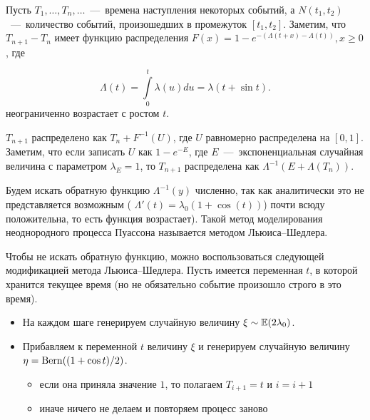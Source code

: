 

Пусть \( T_1,\ldots,T_n,\ldots \)~---~времена наступления некоторых 
 событий, а \( N(t_1,t_2) \)~---~количество событий, произошедших в 
 промежуток \( [t_1,t_2] \). Заметим, что \( T_{n+1}-T_n \) имеет 
 функцию распределения \( F(x)=1-e^{-(\Lambda(t+x)-\Lambda(t))}, x 
 \geq 0 \), где 


\[
 \Lambda(t)=\int\limits_0^t\lambda(u)du=\lambda(t+\sin t).
\]
неограниченно возрастает с ростом \( t \). 

\( T_{n+1} \) распределено как \( T_n+F^{-1}(U) \), где \( U \) 
 равномерно распределена на \( [0,1] \). Заметим, что если записать 
 \( U \) как \( 1-e^{-E} \), где \( E \)~---~экспоненциальная случайная 
 величина с параметром \( \lambda_E=1 \), то \( T_{n+1} \) распределена 
 как \( \Lambda^{-1}(E+\Lambda(T_n)) \).

Будем искать обратную функцию \( \Lambda^{-1}(y) \) численно, так как 
 аналитически это не представляется возможным ( \( \Lambda'(t) = 
 \lambda_0(1+\cos(t)) \)) почти всюду положительна, то есть функция 
 возрастает). Такой метод моделирования неоднородного процесса Пуассона 
 называется методом Льюиса--Шедлера.

Чтобы не искать обратную функцию, можно воспользоваться следующей 
 модификацией метода Льюиса--Шедлера. Пусть имеется переменная \( t \), 
 в которой хранится текущее время (но не обязательно событие произошло 
 строго в это время). 

\begin{itemize}
	\item На каждом шаге генерируем случайную величину \( \xi \sim 
     \operatorname{\mathbb{E}}(2\lambda_0) \).
	\item Прибавляем к переменной \( t \) величину \( \xi \) и генерируем 
     случайную величину \( \eta=\operatorname{\mathrm{Bern}}((1+\cos t)/2) \).
	\begin{itemize}
			\item если она приняла значение \( 1 \), то полагаем 
             \( T_{i+1}=t \) и \( i=i+1 \)
			\item иначе ничего не делаем и повторяем процесс заново
	\end{itemize}
\end{itemize}

